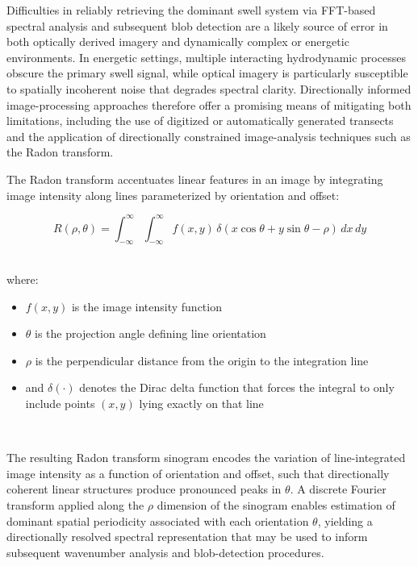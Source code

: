 \documentclass[12pt]{article}
\begin{document}
Difficulties in reliably retrieving the dominant swell system via FFT-based spectral analysis and subsequent blob detection are a likely source of error in both optically derived imagery and dynamically complex or energetic environments. In energetic settings, multiple interacting hydrodynamic processes obscure the primary swell signal, while optical imagery is particularly susceptible to spatially incoherent noise that degrades spectral clarity. Directionally informed image-processing approaches therefore offer a promising means of mitigating both limitations, including the use of digitized or automatically generated transects and the application of directionally constrained image-analysis techniques such as the Radon transform.~\cite{Bergsma2019}

The Radon transform accentuates linear features in an image by integrating image intensity along lines parameterized by orientation and offset:

\begin{equation}
R(\rho, \theta)=\int_{-\infty}^{\infty}\int_{-\infty}^{\infty}f(x, y)\,\delta\!\left(x \cos \theta + y \sin \theta -\rho\right)\, dx \, dy
\end{equation}
~\cite{Bergsma2019}

where:
{\small
\begin{itemize}
    \item $f(x,y)$ is the image intensity function 
    \item $\theta$ is the projection angle defining line orientation
    \item $\rho$ is the perpendicular distance from the origin to the integration line
    \item and \( \delta(\cdot) \) denotes the Dirac delta function that forces the integral to only include points $(x, y)$ lying exactly on that line
\end{itemize}
}
~\cite{Bergsma2019}

The resulting Radon transform sinogram encodes the variation of line-integrated image intensity as a function of orientation and offset, such that directionally coherent linear structures produce pronounced peaks in $\theta$. A discrete Fourier transform applied along the $\rho$ dimension of the sinogram enables estimation of dominant spatial periodicity associated with each orientation $\theta$, yielding a directionally resolved spectral representation that may be used to inform subsequent wavenumber analysis and blob-detection procedures.~\cite{Bergsma2019}
\end{document}
